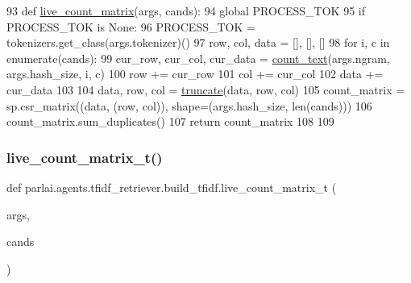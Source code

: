 \begin{DoxyCode}
93 \textcolor{keyword}{def }\hyperlink{namespaceparlai_1_1agents_1_1tfidf__retriever_1_1build__tfidf_af51dc8629608fd04435739ba76b1e8f2}{live\_count\_matrix}(args, cands):
94     \textcolor{keyword}{global} PROCESS\_TOK
95     \textcolor{keywordflow}{if} PROCESS\_TOK \textcolor{keywordflow}{is} \textcolor{keywordtype}{None}:
96         PROCESS\_TOK = tokenizers.get\_class(args.tokenizer)()
97     row, col, data = [], [], []
98     \textcolor{keywordflow}{for} i, c \textcolor{keywordflow}{in} enumerate(cands):
99         cur\_row, cur\_col, cur\_data = \hyperlink{namespaceparlai_1_1agents_1_1tfidf__retriever_1_1build__tfidf_a76bae1c966a21d123cb91949d6c8ec20}{count\_text}(args.ngram, args.hash\_size, i, c)
100         row += cur\_row
101         col += cur\_col
102         data += cur\_data
103 
104     data, row, col = \hyperlink{namespaceparlai_1_1agents_1_1tfidf__retriever_1_1build__tfidf_a5bd546d494142d2d7e2772a3d60583f9}{truncate}(data, row, col)
105     count\_matrix = sp.csr\_matrix((data, (row, col)), shape=(args.hash\_size, len(cands)))
106     count\_matrix.sum\_duplicates()
107     \textcolor{keywordflow}{return} count\_matrix
108 
109 
\end{DoxyCode}
\mbox{\label{namespaceparlai_1_1agents_1_1tfidf__retriever_1_1build__tfidf_af6a82e7b8a6efb75fb73be53b55a7787}} 
\subsubsection{\texorpdfstring{live\+\_\+count\+\_\+matrix\+\_\+t()}{live\_count\_matrix\_t()}}
{\footnotesize\ttfamily def parlai.\+agents.\+tfidf\+\_\+retriever.\+build\+\_\+tfidf.\+live\+\_\+count\+\_\+matrix\+\_\+t (\begin{DoxyParamCaption}\item[{}]{args,  }\item[{}]{cands }\end{DoxyParamCaption})}



